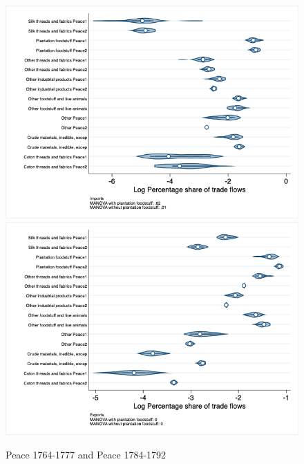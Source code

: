 \documentclass[12pt,a4paper,notitlepage,english]{article}
\begin{document}
\begin{figure}
\centering
\caption{Peace 1764-1777 and Peace 1784-1792}
\label{seven_peace1764_1777_nat_distr_aggr}
\includegraphics[scale=.4]{peace1764_1777_peace1784_1792_nat_distr_Iaggr}
\includegraphics[scale=.4]{peace1764_1777_peace1784_1792_nat_distr_Xaggr}
\end{figure}
\end{document}
